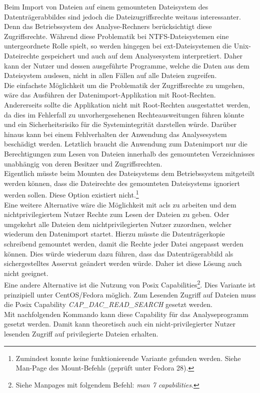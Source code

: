 \noindent
Beim Import von Dateien auf einem gemounteten Dateisystem des Datenträgerabbildes sind jedoch die Dateizugriffsrechte weitaus interessanter. Denn das Betriebssystem des Analyse-Rechners berücksichtigt diese Zugriffsrechte. Während diese Problematik bei NTFS-Dateisystemen eine untergeordnete Rolle spielt, so werden hingegen bei ext-Dateisystemen die Unix-Dateirechte gespeichert und auch auf dem Analysesystem interpretiert. 
Daher kann der Nutzer und dessen ausgeführte Programme, welche die Daten aus dem Dateisystem auslesen, nicht in allen Fällen auf alle Dateien zugreifen.\\

\noindent
Die einfachste Möglichkeit um die Problematik der Zugriffsrechte zu umgehen, wäre das Ausführen der Datenimport-Applikation mit Root-Rechten. Andererseits sollte die Applikation nicht mit Root-Rechten ausgestattet werden, da dies im Fehlerfall zu unvorhergesehenen Rechteausweitungen führen könnte und ein Sicherheitsrisiko für die Systemintegrität darstellen würde. Darüber hinaus kann bei einem Fehlverhalten der Anwendung das Analysesystem beschädigt werden. Letztlich braucht die Anwendung zum Datenimport nur die Berechtigungen zum Lesen von Dateien innerhalb des gemounteten Verzeichnisses unabhängig von deren Besitzer und Zugriffsrechten.\\

\noindent
Eigentlich müsste beim Mounten des Dateisystems dem Betriebssystem mitgeteilt werden können, dass die Dateirechte des gemounteten Dateisystems ignoriert werden sollen. Diese Option existiert nicht.\footnote{Zumindest konnte keine funktionierende Variante gefunden werden. Siehe Man-Page des Mount-Befehls (geprüft unter Fedora 28).}\\
Eine weitere Alternative wäre die Möglichkeit mit \glspl{acl} zu arbeiten und dem nichtprivilegiertem Nutzer Rechte zum Lesen der Dateien zu geben. Oder umgekehrt alle Dateien dem nichtprivilegierten Nutzer zuzordnen, welcher wiederum den Datenimport startet.
Hierzu müsste die Datenträgerkopie schreibend gemountet werden, damit die Rechte jeder Datei angepasst werden können. Dies würde wiederum dazu führen, dass das Datenträgerabbild als sichergestelltes Asservat geändert werden würde. 
Daher ist diese Lösung auch nicht geeignet.\\

\noindent
Eine andere Alternative ist die Nutzung von Posix Capabilities\footnote{Siehe Manpages mit folgendem Befehl: \textit{ man 7 capabilities}.}. Dies Variante ist prinzipiell unter CentOS/Fedora möglich. Zum Lesenden Zugriff auf Dateien muss die Posix Capability \textit{CAP\_DAC\_READ\_SEARCH} gesetzt werden.\\
Mit nachfolgenden Kommando kann diese Capability für das Analyseprogramm gesetzt werden.
Damit kann theoretisch auch ein nicht-privilegierter Nutzer lesenden Zugriff auf privilegierte Dateien erhalten.\\ 

